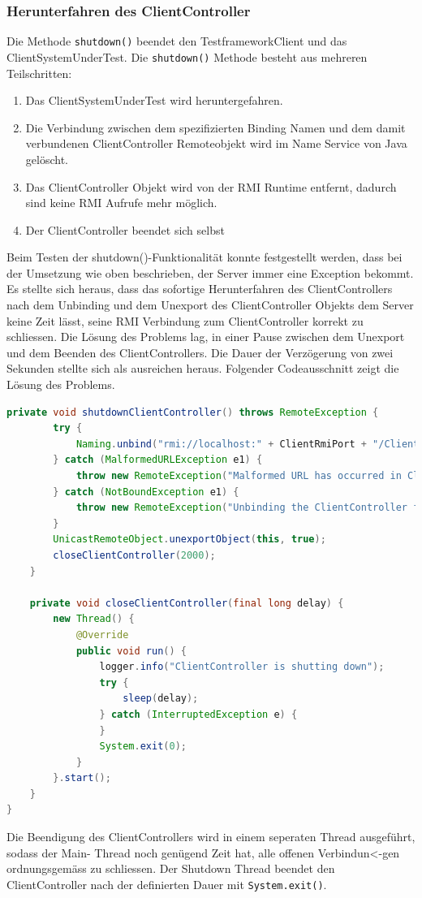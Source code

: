 \subsubsection{Herunterfahren des ClientController}
Die Methode \verb+shutdown()+ be\-endet den Test\-framework\-Client und das Client\-System\-Under\-Test. Die \verb+shutdown()+ Me\-tho\-de besteht aus mehreren Teil\-schritten:
\begin{enumerate}
\item Das ClientSystemUnderTest wird heruntergefahren.
\item Die Verbindung zwischen dem spezifizierten Binding Namen und dem damit verbundenen ClientController Remoteobjekt wird im Name Service von Java gelöscht.
\item Das ClientController Objekt wird von der RMI Run\-time entfernt, da\-durch sind keine RMI Aufrufe mehr möglich.
\item Der ClientController beendet sich selbst
\end{enumerate}


Beim Testen der shutdown()-Funktionalität konnte festgestellt werden, dass bei der Umsetzung wie oben beschrieben, der Server immer eine Exception bekommt. Es stellte sich heraus, dass das sofortige Herunterfahren des ClientControllers nach dem Unbinding und dem Unexport des ClientController Objekts dem Server keine Zeit lässt, seine RMI Verbindung zum ClientController korrekt zu schliessen. Die Lösung des Problems lag, in einer Pause zwischen dem Unexport und dem Beenden des ClientControllers. Die Dauer der Verzögerung von zwei Sekunden stellte sich als ausreichen heraus. Folgender Codeausschnitt zeigt die Lösung des Problems.
\begin{lstlisting}[language=java, breaklines=true]
private void shutdownClientController() throws RemoteException {
		try {
			Naming.unbind("rmi://localhost:" + ClientRmiPort + "/Client");
		} catch (MalformedURLException e1) {
			throw new RemoteException("Malformed URL has occurred in ClientController", e1);
		} catch (NotBoundException e1) {
			throw new RemoteException("Unbinding the ClientController failed", e1);
		}
		UnicastRemoteObject.unexportObject(this, true);
		closeClientController(2000);
	}

	private void closeClientController(final long delay) {
		new Thread() {
			@Override
			public void run() {
				logger.info("ClientController is shutting down");
				try {
					sleep(delay);
				} catch (InterruptedException e) {
				}
				System.exit(0);
			}
		}.start();
	}
}
\end{lstlisting}
Die Beendigung des ClientControllers wird in einem seperaten Thread ausgeführt, so\-dass der Main- Thread noch ge\-nü\-gend Zeit hat, alle of\-fe\-nen Ver\-bin\-dun<-gen ord\-nungs\-gemäss zu schliessen. Der Shutdown Thread beendet den ClientController nach der definierten Dauer mit \verb+System.exit()+.   

